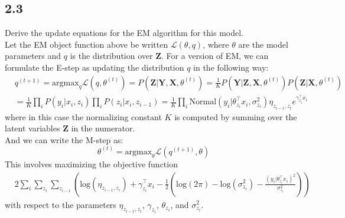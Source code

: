 \documentclass[12pt]{article}
\begin{document}
\subsection*{2.3}
Derive the update equations for the EM algorithm for this model.
\\

Let the EM object function above be written $\mathcal{L}(\theta,q)$, where $\theta$ are the model parameters and $q$ is the distribution over $\textbf{Z}$. For a version of EM, we can formulate the E-step as updating the distribution $q$ in the following way: 
\begin{equation}
    \begin{split}
        & q^{(t+1)} = \text{argmax}_q \mathcal{L}(q,\theta^{(t)}) = P(\textbf{Z} | \textbf{Y}, \textbf{X}, \theta^{(t)})
            = \frac{1}{K} P(\textbf{Y} | \textbf{Z}, \textbf{X}, \theta^{(t)}) P(\textbf{Z} | \textbf{X}, \theta^{(t)}) \\
        & = \frac{1}{K} \prod_i P(y_i | x_i, z_i) \prod_i P(z_i | x_i, z_{i-1})
            = \frac{1}{K} \prod_i \text{Normal}(y_i | \theta_{z_i}^{\top} x_i, \sigma_{z_i}^2)  
            \eta_{z_{i-1},z_i} e^{\gamma_{z_i}^{\top} x_i}
    \end{split}
\end{equation}
where in this case the normalizing constant $K$ is computed by summing over the latent variables $\textbf{Z}$ in the numerator.
\\

And we can write the M-step as:
\begin{equation}
    \theta^{(t)} = \text{argmax}_{\theta} \mathcal{L}(q^{(t+1)},\theta)
\end{equation}
This involves maximizing the objective function 
\begin{equation}
    \begin{split}
        & 2\sum_i \sum_{z_i} \sum_{z_{i-1}} \left( \text{log}(\eta_{z_{i-1},z_i}) + \gamma_{z_i}^{\top} x_i 
             -\frac{1}{2}\left( \text{log}(2\pi) - \text{log}(\sigma_{z_i}^2) - \frac{(y_i | \theta_{z_i}^{\top} x_i)^2}{ \sigma_{z_i}^2} \right)  \right)
    \end{split}
\end{equation}
with respect to the parameters $\eta_{z_{i-1},z_i}$, $\gamma_{z_i}$, $\theta_{z_i}$, and $\sigma_{z_i}^2$.
\end{document}
